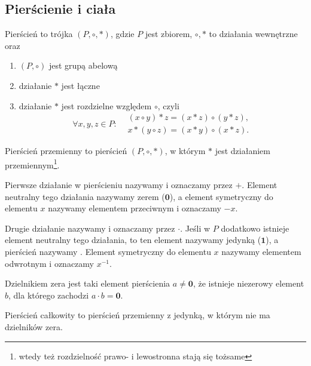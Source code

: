 \subsection{Pierścienie i ciała}
\begin{definition}
    Pierścień to trójka $(P, \circ, *)$, gdzie $P$ jest zbiorem, $\circ, *$ to działania wewnętrzne oraz
    \begin{enumerate}
        \item $(P, \circ)$ jest grupą abelową
        \item działanie $*$ jest łączne
        \item działanie $*$ jest rozdzielne względem $\circ$, czyli
        $$\forall x, y, z \in P : \begin{aligned}& (x \circ y) * z = (x * z) \circ (y * z), \\
                                                 & x * (y \circ z) = (x * y) \circ (x * z).\end{aligned} $$
    \end{enumerate}
\end{definition}

\begin{definition}
    Pierścień przemienny to pierścień $(P, \circ, *)$, w którym $*$ jest działaniem przemiennym\footnote{wtedy też rozdzielność prawo- i lewostronna stają się tożsame}.
\end{definition}

Pierwsze działanie w pierścieniu nazywamy  i oznaczamy przez $+$. Element neutralny tego działania nazywamy zerem ($\mathbf{0}$), a element symetryczny do elementu $x$ nazywamy elementem przeciwnym i oznaczamy $-x$.

Drugie działanie nazywamy  i oznaczamy przez $\cdot$. Jeśli w $P$ dodatkowo istnieje element neutralny tego działania, to ten element nazywamy jedynką ($\mathbf{1}$), a pierścień nazywamy . Element symetryczny do elementu $x$ nazywamy elementem odwrotnym i oznaczamy $x^{-1}$.

\begin{definition}
    Dzielnikiem zera jest taki element pierścienia $a \neq \mathbf{0}$, że istnieje niezerowy element $b$, dla którego zachodzi $a \cdot b = \mathbf{0}$.
\end{definition}

\begin{definition}
    Pierścień całkowity to pierścień przemienny z jedynką, w którym nie ma dzielników zera.
\end{definition}

